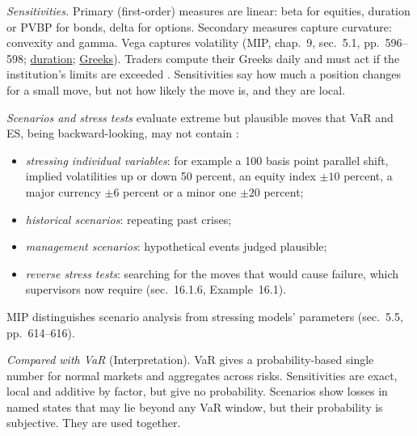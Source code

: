 \begin{qfmethod}\label{meth:sensitivity-scenario-risk-measures}
 \emph{Sensitivities.} Primary (first-order) measures are linear: beta for equities, duration or PVBP for bonds, delta for options. Secondary measures capture curvature: convexity and gamma. Vega captures volatility (MIP, chap.~9, sec.~5.1, pp.~596--598; \hyperref[meth:yield-duration-pvbp]{duration}; \hyperref[meth:greeks-delta-gamma-hedging]{Greeks}). Traders compute their Greeks daily and must act if the institution's limits are exceeded \citep[chap.~15, p.~319]{risk-management-financial-institutions-2023}. Sensitivities say how much a position changes for a small move, but not how likely the move is, and they are local.

\emph{Scenarios and stress tests} evaluate extreme but plausible moves that VaR and ES, being backward-looking, may not contain \citep[chap.~16, pp.~347--352]{risk-management-financial-institutions-2023}:
\begin{itemize}
\item \emph{stressing individual variables}: for example a 100 basis point parallel shift, implied volatilities up or down 50 percent, an equity index $\pm10$ percent, a major currency $\pm6$ percent or a minor one $\pm20$ percent;
\item \emph{historical scenarios}: repeating past crises;
\item \emph{management scenarios}: hypothetical events judged plausible;
\item \emph{reverse stress tests}: searching for the moves that would cause failure, which supervisors now require (sec.~16.1.6, Example~16.1).
\end{itemize}
MIP distinguishes scenario analysis from stressing models' parameters (sec.~5.5, pp.~614--616).

\emph{Compared with VaR} (Interpretation). VaR gives a probability-based single number for normal markets and aggregates across risks. Sensitivities are exact, local and additive by factor, but give no probability. Scenarios show losses in named states that may lie beyond any VaR window, but their probability is subjective. They are used together.


\end{qfmethod}

